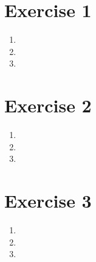\section*{Exercise 1}

\begin{enumerate}[label=\alph*)]
    \item {
        
    
    }
    \item {
    
    }
    \item {
    
    }
\end{enumerate}

\section*{Exercise 2}

\begin{enumerate}[label=\alph*)]
    \item {
    
    }
    \item {
    
    }
    \item {
    
    }
\end{enumerate}

\section*{Exercise 3}

\begin{enumerate}[label=\alph*)]
    \item {
    
    }
    \item {
    
    }
    \item {
    
    }
\end{enumerate}
